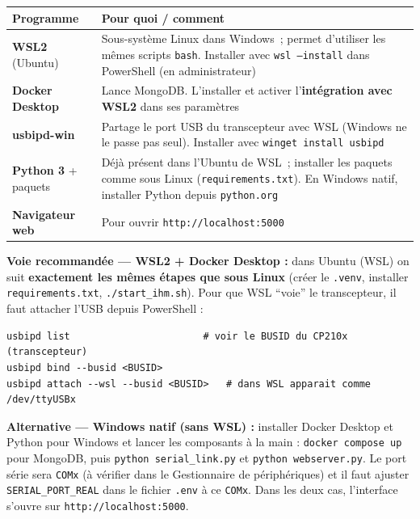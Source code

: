\documentclass[12pt,a4paper]{article}
\newcommand{\file}[1]{\texttt{#1}}
\begin{document}
\begin{longtable}{L{4.2cm} L{8.8cm}}
  \toprule
  \textcolor{tableheadfg}{\textbf{Programme}} &
  \textcolor{tableheadfg}{\textbf{Pour quoi / comment}} \\
  \midrule
  \endhead
  \bottomrule
  \endfoot
  \textbf{WSL2} (Ubuntu) & Sous-syst\`eme Linux dans Windows~; permet d'utiliser les
    m\^emes scripts \texttt{bash}. Installer avec \texttt{wsl --install} dans
    PowerShell (en administrateur) \\[3pt]
  \textbf{Docker Desktop} & Lance MongoDB. L'installer et activer
    l'\textbf{int\'egration avec WSL2} dans ses param\`etres \\[3pt]
  \textbf{usbipd-win} & Partage le port USB du transcepteur avec WSL (Windows ne le
    passe pas seul). Installer avec \texttt{winget install usbipd} \\[3pt]
  \textbf{Python 3} + paquets & D\'ej\`a pr\'esent dans l'Ubuntu de WSL~; installer
    les paquets comme sous Linux (\file{requirements.txt}). En Windows natif,
    installer Python depuis \texttt{python.org} \\[3pt]
  \textbf{Navigateur web} & Pour ouvrir \texttt{http://localhost:5000} \\
\end{longtable}

\textbf{Voie recommand\'ee --- WSL2 + Docker Desktop :} dans Ubuntu (WSL) on suit
\textbf{exactement les m\^emes \'etapes que sous Linux} (cr\'eer le \texttt{.venv},
installer \file{requirements.txt}, \file{./start\_ihm.sh}). Pour que WSL ``voie'' le
transcepteur, il faut attacher l'USB depuis PowerShell :

\begin{lstlisting}[style=shell, caption={Attacher l'USB du transcepteur a WSL (PowerShell admin)}]
usbipd list                       # voir le BUSID du CP210x (transcepteur)
usbipd bind --busid <BUSID>
usbipd attach --wsl --busid <BUSID>   # dans WSL apparait comme /dev/ttyUSBx
\end{lstlisting}

\textbf{Alternative --- Windows natif (sans WSL) :} installer Docker Desktop et
Python pour Windows et lancer les composants à la main : \texttt{docker compose up}
pour MongoDB, puis \texttt{python serial\_link.py} et \texttt{python webserver.py}.
Le port s\'erie sera \texttt{COMx} (à v\'erifier dans le Gestionnaire de
p\'eriph\'eriques) et il faut ajuster \texttt{SERIAL\_PORT\_REAL} dans le fichier
\file{.env} à ce \texttt{COMx}. Dans les deux cas, l'interface s'ouvre sur
\texttt{http://localhost:5000}.
\end{document}
